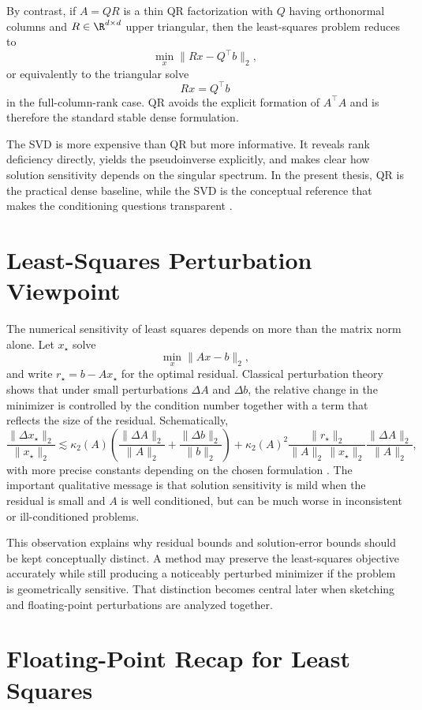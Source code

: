 By contrast, if \(A = QR\) is a thin QR factorization with \(Q\) having orthonormal
columns and \(R \in \R^{d \times d}\) upper triangular, then the least-squares problem
reduces to
\[
	\min_x \|Rx - Q^\top b\|_2,
\]
or equivalently to the triangular solve
\[
	Rx = Q^\top b
\]
in the full-column-rank case. QR avoids the explicit formation of \(A^\top A\) and is
therefore the standard stable dense formulation.

The SVD is more expensive than QR but more informative. It reveals rank
deficiency directly, yields the pseudoinverse explicitly, and makes clear how
solution sensitivity depends on the singular spectrum. In the present thesis, QR is
the practical dense baseline, while the SVD is the conceptual reference that makes
the conditioning questions transparent \cite{bjorck1996leastsquares}.

\section{Least-Squares Perturbation Viewpoint}

The numerical sensitivity of least squares depends on more than the matrix norm
alone. Let \(x_\star\) solve
\[
	\min_x \|Ax-b\|_2,
\]
and write \(r_\star = b - Ax_\star\) for the optimal residual. Classical perturbation
theory shows that under small perturbations \(\Delta A\) and \(\Delta b\), the relative
change in the minimizer is controlled by the condition number together with a term
that reflects the size of the residual. Schematically,
\[
	\frac{\|\Delta x_\star\|_2}{\|x_\star\|_2}
	\lesssim
	\kappa_2(A)
	\left(
	\frac{\|\Delta A\|_2}{\|A\|_2}
	+
	\frac{\|\Delta b\|_2}{\|b\|_2}
	\right)
	+
	\kappa_2(A)^2
	\frac{\|r_\star\|_2}{\|A\|_2\,\|x_\star\|_2}
	\frac{\|\Delta A\|_2}{\|A\|_2},
\]
with more precise constants depending on the chosen formulation
\cite[Ch.~1]{bjorck1996leastsquares}. The important qualitative message is that
solution sensitivity is mild when the residual is small and \(A\) is well
conditioned, but can be much worse in inconsistent or ill-conditioned problems.

This observation explains why residual bounds and solution-error bounds should be
kept conceptually distinct. A method may preserve the least-squares objective
accurately while still producing a noticeably perturbed minimizer if the problem is
geometrically sensitive. That distinction becomes central later when sketching and
floating-point perturbations are analyzed together.

\section{Floating-Point Recap for Least Squares}

